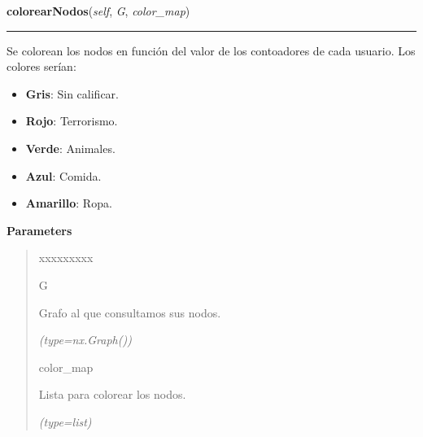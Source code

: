 \hspace{.8\funcindent}\begin{boxedminipage}{\funcwidth}

    \raggedright \textbf{colorearNodos}(\textit{self}, \textit{G}, \textit{color\_map})

    \vspace{-1.5ex}

    \rule{\textwidth}{0.5\fboxrule}
\setlength{\parskip}{2ex}
    Se colorean los nodos en función del valor de los contoadores de cada 
    usuario. Los colores serían:

    \begin{itemize}
    \setlength{\parskip}{0.6ex}
      \item \textbf{Gris}: Sin calificar.

      \item \textbf{Rojo}: Terrorismo.

      \item \textbf{Verde}: Animales.

      \item \textbf{Azul}: Comida.

      \item \textbf{Amarillo}: Ropa.

    \end{itemize}

\setlength{\parskip}{1ex}
      \textbf{Parameters}
      \vspace{-1ex}

      \begin{quote}
        \begin{Ventry}{xxxxxxxxx}

          \item[G]

          Grafo al que consultamos sus nodos.

            {\it (type=nx.Graph())}

          \item[color\_map]

          Lista para colorear los nodos.

            {\it (type=list)}

        \end{Ventry}

      \end{quote}

    \end{boxedminipage}

    \label{grafico:Grafico:borrarGrafo}

